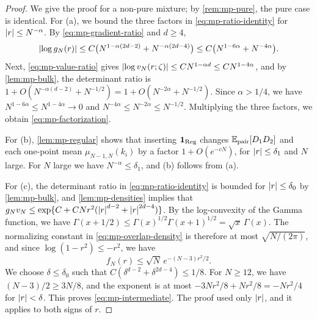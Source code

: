 \begin{proof}
We give the proof for a non-pure mixture; by \cref{rem:mp-pure}, the pure case is identical. For (a), we bound the three factors in \eqref{eq:mp-ratio-identity} for $\left|r\right|\le N^{-\alpha}$. By \eqref{eq:mp-gradient-ratio} and $d\ge4$,
\[
\left|\log g_N(r)\right|\le C\bigl(N^{1-\alpha(2d-2)}+N^{-\alpha(2d-4)}\bigr)\le C\bigl(N^{1-6\alpha}+N^{-4\alpha}\bigr).
\]
Next, \eqref{eq:mp-value-ratio} gives $\left|\log v_N(r;\zeta)\right|\le CN^{1-\alpha d}\le CN^{1-4\alpha}$, and by \cref{lem:mp-bulk}, the determinant ratio is $1+O(N^{-\alpha(d-2)}+N^{-1/2})=1+O(N^{-2\alpha}+N^{-1/2})$. Since $\alpha>1/4$, we have $N^{1-6\alpha}\le N^{1-4\alpha}\to0$ and $N^{-4\alpha}\le N^{-2\alpha}\le N^{-1/2}$. Multiplying the three factors, we obtain \eqref{eq:mp-factorization}.

For (b), \cref{lem:mp-regular} shows that inserting $\mathbf 1_{\mathrm{Reg}}$ changes $\mathbb E_{\mathrm{pair}}[D_1D_2]$ and each one-point mean $\mu_{N-1,N}(k_i)$ by a factor $1+O(e^{-cN})$, for $\left|r\right|\le\delta_1$ and $N$ large. For $N$ large we have $N^{-\alpha}\le\delta_1$, and (b) follows from (a).

For (c), the determinant ratio in \eqref{eq:mp-ratio-identity} is bounded for $\left|r\right|\le\delta_0$ by \cref{lem:mp-bulk}, and \cref{lem:mp-densities} implies that $g_Nv_N\le\exp\{C+CNr^2(\left|r\right|^{d-2}+\left|r\right|^{2d-4})\}$. By the log-convexity of the Gamma function, we have $\Gamma(x+1/2)\le\Gamma(x)^{1/2}\Gamma(x+1)^{1/2}=\sqrt x\,\Gamma(x)$. The normalizing constant in \eqref{eq:mp-overlap-density} is therefore at most $\sqrt{N/(2\pi)}$, and since $\log(1-r^2)\le-r^2$, we have
\[
f_N(r)\le\sqrt N\,e^{-(N-3)r^2/2}.
\]
We choose $\delta\le\delta_0$ such that $C(\delta^{d-2}+\delta^{2d-4})\le1/8$. For $N\ge12$, we have $(N-3)/2\ge3N/8$, and the exponent is at most $-3Nr^2/8+Nr^2/8=-Nr^2/4$ for $\left|r\right|<\delta$. This proves \eqref{eq:mp-intermediate}. The proof used only $\left|r\right|$, and it applies to both signs of $r$.
\end{proof}


